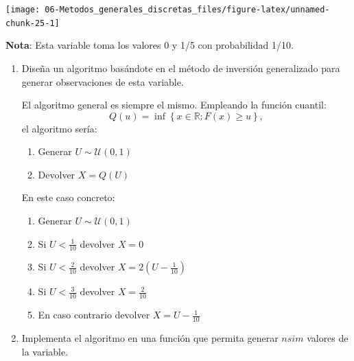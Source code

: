 \documentclass[
]{book}
\theoremstyle{break}
\theoremstyle{definition}
\theoremstyle{definition}
\theoremstyle{definition}
\theoremstyle{definition}
\theoremstyle{remark}
\begin{document}
\begin{center}\texttt{[image: 06-Metodos\_generales\_discretas\_files/figure-latex/unnamed-chunk-25-1]} \end{center}

\textbf{Nota}: Esta variable toma los valores 0 y 1/5 con probabilidad 1/10.

\begin{enumerate}
\def\labelenumi{\alph{enumi})}
\item
  Diseña un algoritmo basándote en el método de inversión generalizado
  para generar observaciones de esta variable.

  El algoritmo general es siempre el mismo. Empleando la función cuantil:
  \[Q\left( u\right) = \inf \left\{ x\in \mathbb{R}:F\left( x\right) 
  \geq u\right\},\]
  el algoritmo sería:

  \begin{enumerate}
  \def\labelenumii{\arabic{enumii}.}
  \item
    Generar \(U\sim \mathcal{U}\left( 0,1\right)\)
  \item
    Devolver \(X=Q\left( U\right)\)
  \end{enumerate}

  En este caso concreto:

  \begin{enumerate}
  \def\labelenumii{\arabic{enumii}.}
  \item
    Generar \(U\sim \mathcal{U}\left( 0,1\right)\)
  \item
    Si \(U < \frac{1}{10}\) devolver \(X = 0\)
  \item
    Si \(U < \frac{2}{10}\) devolver \(X = 2(U - \frac{1}{10})\)
  \item
    Si \(U < \frac{3}{10}\) devolver \(X = \frac{2}{10}\)
  \item
    En caso contrario devolver \(X = U - \frac{1}{10}\)
  \end{enumerate}
\item
  Implementa el algoritmo en una función que permita generar \(nsim\)
  valores de la variable.


\end{enumerate}
\end{document}
